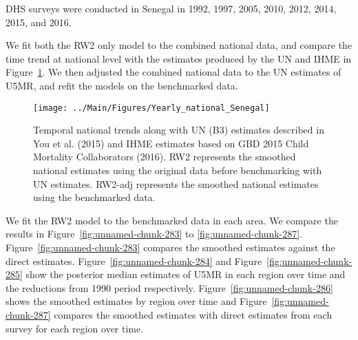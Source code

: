 \documentclass[12pt]{article}\usepackage[]{graphicx}\usepackage[]{color}
\newenvironment{knitrout}{}{} %
\begin{document}


DHS surveys were conducted in Senegal in 1992, 1997, 2005, 2010, 2012, 2014, 2015, and 2016.

We fit both the RW2 only model to the combined national data, and compare the time trend at national level with the estimates produced by the UN and IHME in Figure~\ref{fig:unnamed-chunk-282}. We then adjusted the combined national data to the UN estimates of U5MR, and refit the models on the benchmarked data. 

\begin{knitrout}
\color{fgcolor}\begin{figure}[bht]

{\centering \texttt{[image: ../Main/Figures/Yearly\_national\_Senegal]} 

}

\caption[Temporal national trends along with UN (B3) estimates described in You et al]{Temporal national trends along with UN (B3) estimates described in You et al. (2015) and IHME estimates based on GBD 2015 Child Mortality Collaborators (2016). RW2 represents the smoothed national estimates using the original data before benchmarking with UN estimates. RW2-adj represents the smoothed national estimates using the benchmarked data.}\label{fig:unnamed-chunk-282}
\end{figure}


\end{knitrout}
 

We fit the RW2 model to the benchmarked data in each area. 
We compare the results in Figure~\ref{fig:unnamed-chunk-283} to \ref{fig:unnamed-chunk-287}.
Figure~\ref{fig:unnamed-chunk-283} compares the smoothed estimates against the direct estimates. Figure~\ref{fig:unnamed-chunk-284} and Figure~\ref{fig:unnamed-chunk-285} show the posterior median estimates of U5MR in each region over time and the reductions from 1990 period respectively.
Figure~\ref{fig:unnamed-chunk-286} shows the smoothed estimates by region over time and Figure~\ref{fig:unnamed-chunk-287} compares the smoothed estimates with direct estimates from each survey for each region over time.


\end{document}
